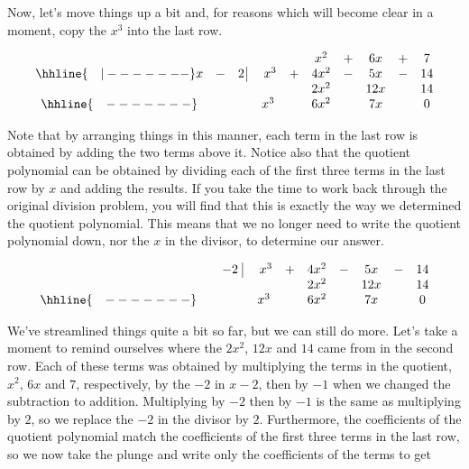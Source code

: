 \setlength\arraycolsep{5pt}
\setlength\extrarowheight{0pt}

Now, let's move things up a bit and, for reasons which will become clear in a moment, copy the $x^3$ into the last row.


\setlength\arraycolsep{0.1pt}
\setlength\extrarowheight{2pt}

\[ \begin{array}{cccccccccc}

& & & & & x^2 & + & 6x & + & 7 \\ \hhline{~~~|-------}

x & - & 2 \, \vline& \, \, x^3 & + & 4x^2 & - & 5x & - & 14 \\

 &  &  &   & &   2x^2 &  & 12x &  & 14 \\ \hhline{~~~-------} 
 &  &  & x^3  &  & 6 x^2 &  & 7x &  &0  \\  
\end{array}\]

\setlength\arraycolsep{5pt}
\setlength\extrarowheight{0pt}

Note that by arranging things in this manner, each term in the last row is obtained by adding the two terms above it.  Notice also that the quotient polynomial can be obtained by dividing each of the first three terms in the last row by $x$ and adding the results.   If you take the time to work back through the original division problem, you will find that this is exactly the way we determined the quotient polynomial.  This means that we no longer need to write the quotient polynomial down, nor the $x$ in the divisor, to determine our answer.

\setlength\arraycolsep{0.1pt}
\setlength\extrarowheight{2pt}

\[ \begin{array}{cccccccccc}


 & & - 2 \, \, \vline& \, \, x^3 & + & 4x^2 & - & 5x & - & 14 \\

 &  &  &   & &   2x^2 &  & 12x &  & 14 \\ \hhline{~~~-------} 
 &  &  & x^3  &  & 6 x^2 &  & 7x &  &0  \\  
\end{array}\]

\setlength\arraycolsep{5pt}
\setlength\extrarowheight{0pt}

We've streamlined things quite a bit so far, but we can still do more.  Let's take a moment to remind ourselves where the $2x^2$, $12x$ and $14$ came from in the second row.  Each of these terms was obtained by multiplying the terms in the quotient, $x^2$, $6x$ and $7$, respectively, by the $-2$ in $x-2$,  then by $-1$ when we changed the subtraction to addition.  Multiplying by $-2$ then by $-1$ is the same as multiplying by $2$, so we replace the $-2$ in the divisor by $2$.   Furthermore, the coefficients of the quotient polynomial match the coefficients of the first three terms in the last row, so we now take the plunge and write only the coefficients of the terms to get



